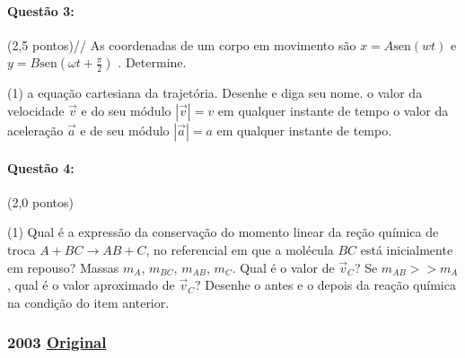 \documentclass[12pt,a4paper]{article}
\newcommand{\original}[1]{\tiny \href{#1}{Original} \normalsize}
\begin{document}
\paragraph{Questão 3:}(2,5 pontos)//
As coordenadas de um corpo em movimento são $x=A\mathrm{sen}(wt)$ e $y=B\mathrm{sen}(\omega t+\frac{\pi}{2})$ . Determine.

\begin{tasks}(1)
\task a equação cartesiana da trajetória. Desenhe e diga seu nome.
\task o valor da velocidade $\vec{v}$ e do seu módulo $\left | \vec{v} \right |=v$ em qualquer instante de tempo
\task o valor da aceleração $\vec{a}$ e de seu módulo $\left | \vec{a} \right |=a$ em qualquer instante de tempo.
\end{tasks}

\paragraph{Questão 4:}(2,0 pontos)\\

\begin{tasks}(1)
\task Qual é a expressão da conservação do momento linear da reção química de troca $A+BC \rightarrow AB+C$, no referencial em que a molécula $BC$ está inicialmente em repouso? Massas $m_A$, $m_{BC}$, $m_{AB}$, $m_C$.
\task Qual é o valor de $\vec{v}_C$?
\task Se $m_{AB}>>m_A$, qual é o valor aproximado de $\vec{v}_C$?
\task Desenhe o antes e o depois da reação química na condição do item anterior.
\end{tasks}

\newpage

\subsubsection{2003 \original{https://drive.google.com/open?id=14VEcfRhra-BzXweNOWDAuLFENl22v4Mk}}
\end{document}
